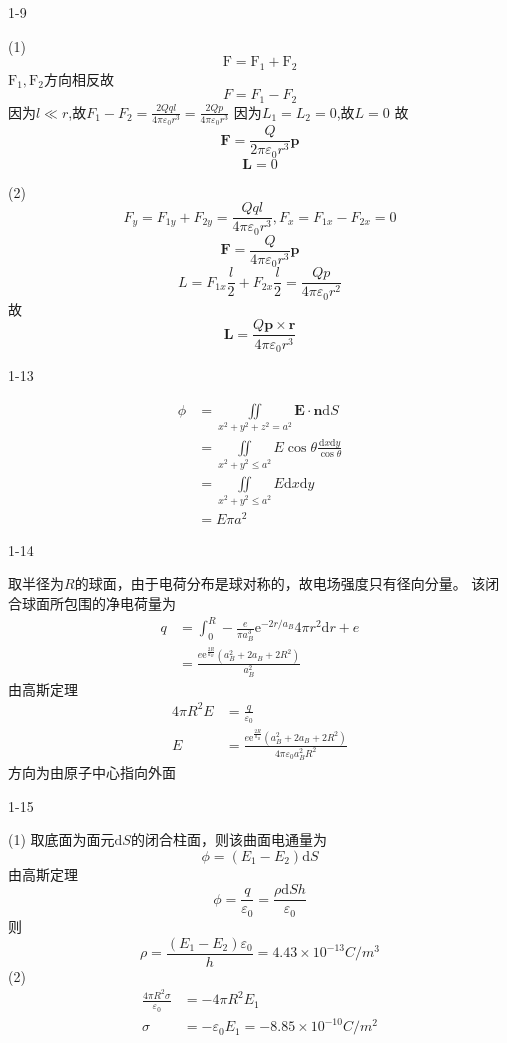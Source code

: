\documentclass{phyasgn}
\begin{document}
{\heiti\color{red} 1-9}
\begin{sol}
(1)
$$\mathrm{F}=\mathrm{F}_1+\mathrm{F}_2$$
$\mathrm{F}_1,\mathrm{F}_2$方向相反故
$$F=F_1-F_2$$
因为$l \ll r$,故$F_1-F_2=\frac{2Qql}{4\pi \varepsilon_0r^3}=\frac{2Qp}{4\pi \varepsilon_0r^3}$
因为$L_1=L_2=0$,故$L=0$
故$$\mathbf{F}=\frac{Q}{2\pi \varepsilon_0r^3}\mathbf{p}$$
$$\mathbf{L}=0$$
\par
(2)$$F_y=F_{1y}+F_{2y}=\frac{Qql}{4\pi \varepsilon_0r^3},F_x=F_{1x}-F_{2x}=0$$
$$\mathbf{F}=\frac{Q}{4\pi \varepsilon_0r^3}\mathbf{p}$$
$$L=F_{1x}\frac{l}{2}+F_{2x}\frac{l}{2}=\frac{Qp}{4\pi\varepsilon_0r^2}$$
故$$
\mathbf{L}=\frac{Q\mathbf{p}\times \mathbf{r}}{4\pi\varepsilon_0r^3}
$$
\end{sol}\par

{\heiti\color{red} 1-13}
\begin{sol}
$$\begin{aligned}
    \phi&=\iint\limits_{x^2+y^2+z^2=a^2}\mathbf{E}\cdot\mathbf{n}\mathrm{d}S\\
    &=\iint\limits_{x^2+y^2\leq a^2}E\cos\theta\frac{\mathrm{d}x\mathrm{d}y}{\cos\theta}\\
    &=\iint\limits_{x^2+y^2\leq a^2}E\mathrm{d}x\mathrm{d}y\\
    &=E\pi a^2
\end{aligned}$$
\end{sol}\par

{\heiti\color{red} 1-14}
\begin{sol}
取半径为$R$的球面，由于电荷分布是球对称的，故电场强度只有径向分量。
该闭合球面所包围的净电荷量为
$$\begin{aligned}
    q&=\int_{0}^{R}-\frac{e}{\pi a_B^3}\mathrm{e}^{-2r/a_B}4\pi r^2\mathrm{d}r+e\\
    &=\frac{e\mathrm{e}^{\frac{2R}{a_B}}(a_B^2+2a_B+2R^2)}{a_B^2}
\end{aligned}$$
由高斯定理
$$\begin{aligned}
    4\pi R^2E&=\frac{q}{\varepsilon_0}\\
    E&=\frac{e\mathrm{e}^{\frac{2R}{a_B}}(a_B^2+2a_B+2R^2)}{4\pi\varepsilon_0a_B^2R^2}
\end{aligned}$$
方向为由原子中心指向外面
\end{sol}\par

{\heiti\color{red} 1-15}
\begin{sol}
(1)
取底面为面元$\mathrm{d}S$的闭合柱面，则该曲面电通量为
$$\phi=(E_1-E_2)\mathrm{d}S$$
由高斯定理
$$\phi=\frac{q}{\varepsilon_0}=\frac{\rho \mathrm{d}S h}{\varepsilon_0}$$
则$$\rho=\frac{(E_1-E_2)\varepsilon_0}{h}=4.43\times 10^{-13}C/m^3$$
(2)$$\begin{aligned}
    \frac{4\pi R^2\sigma}{\varepsilon_0}&=-4\pi R^2E_1\\
    \sigma&=-\varepsilon_0E_1=-8.85\times 10^{-10}C/m^2
\end{aligned}$$
\end{sol}\par
\end{document}
